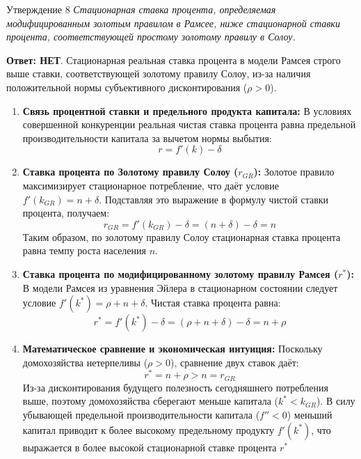 \documentclass[10pt,a4paper]{article}
\newcommand{\qnet}{\textbf{\color{nored}Ответ: НЕТ}}
\newenvironment{answer}[2]{%
  \begin{qbox}{Утверждение #1}
  \textit{#2}\par\smallskip
}{%
  \end{qbox}\vspace{2pt}
}
\begin{document}
\begin{answer}{8}{Стационарная ставка процента, определяемая модифицированным золотым правилом в Рамсее, ниже стационарной ставки процента, соответствующей простому золотому правилу в Солоу.}
\qnet. Стационарная реальная ставка процента в модели Рамсея строго выше ставки, соответствующей золотому правилу Солоу, из-за наличия положительной нормы субъективного дисконтирования ($\rho > 0$).

\begin{enumerate}
    \item \textbf{Связь процентной ставки и предельного продукта капитала:}
    В условиях совершенной конкуренции реальная чистая ставка процента равна предельной производительности капитала за вычетом нормы выбытия:
    \[
    r = f'(k) - \delta
    \]

    \item \textbf{Ставка процента по Золотому правилу Солоу ($r_{GR}$):}
    Золотое правило максимизирует стационарное потребление, что даёт условие $f'(k_{GR}) = n + \delta$. Подставляя это выражение в формулу чистой ставки процента, получаем:
    \[
    r_{GR} = f'(k_{GR}) - \delta = (n + \delta) - \delta = n
    \]
    Таким образом, по золотому правилу Солоу стационарная ставка процента равна темпу роста населения $n$.

    \item \textbf{Ставка процента по модифицированному золотому правилу Рамсея ($r^*$):}
    В модели Рамсея из уравнения Эйлера в стационарном состоянии следует условие $f'(k^*) = \rho + n + \delta$. Чистая ставка процента равна:
    \[
    r^* = f'(k^*) - \delta = (\rho + n + \delta) - \delta = n + \rho
    \]

    \item \textbf{Математическое сравнение и экономическая интуиция:}
    Поскольку домохозяйства нетерпеливы ($\rho > 0$), сравнение двух ставок даёт:
    \[
    r^* = n + \rho > n = r_{GR}
    \]
    Из-за дисконтирования будущего полезность сегодняшнего потребления выше, поэтому домохозяйства сберегают меньше капитала ($k^* < k_{GR}$). В силу убывающей предельной производительности капитала ($f'' < 0$) меньший капитал приводит к более высокому предельному продукту $f'(k^*)$, что выражается в более высокой стационарной ставке процента $r^*$
\end{enumerate}
\end{answer}
\end{document}
